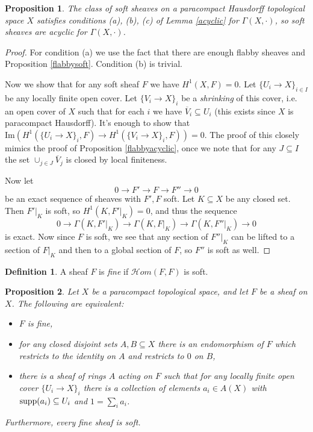 \documentclass[letterpaper,11pt]{article}
\newtheorem{prop}{Proposition}
\theoremstyle{definition}
\newtheorem{defn}{Definition}
\theoremstyle{remark}
\begin{document}
\begin{prop} The class of soft sheaves on a paracompact Hausdorff topological space $X$ satisfies conditions {\rm (a), (b), (c)} of Lemma \ref{acyclic} for $\Gamma(X,\cdot)$, so soft sheaves are acyclic for $\Gamma(X,\cdot)$.
\end{prop}
\begin{proof} For condition (a) we use the fact that there are enough flabby sheaves and Proposition \ref{flabbysoft}. Condition (b) is trivial.

Now we show that for any soft sheaf $F$ we have $H^1(X,F) = 0$. Let $\{U_i\rightarrow X\}_{i\in I}$ be any locally finite open cover. Let $\{V_i\rightarrow X\}_i$ be a \emph{shrinking} of this cover, i.e. an open cover of $X$ such that for each $i$ we have $\overline{V}_i \subseteq U_i$ (this exists since $X$ is paracompact Hausdorff). It's enough to show that $\mbox{Im}(H^1(\{U_i\rightarrow X\}_i,F)\rightarrow H^1(\{V_i\rightarrow X\}_i,F)) = 0$. The proof of this closely mimics the proof of Proposition \ref{flabbyacyclic}, once we note that for any $J\subseteq I$ the set $\cup_{j\in J}\overline{V}_j$ is closed by local finiteness.

Now let
\[
0 \rightarrow F' \rightarrow F \rightarrow F'' \rightarrow 0
\]
be an exact sequence of sheaves with $F', F$ soft. Let $K\subseteq X$ be any closed set. Then $F'|_K$ is soft, so $H^1(K,F'|_K) = 0$, and thus the sequence
\[
0 \rightarrow \Gamma(K,F'|_K) \rightarrow \Gamma(K,F|_K) \rightarrow \Gamma(K,F''|_K) \rightarrow 0
\]
is exact. Now since $F$ is soft, we see that any section of $F''|_K$ can be lifted to a section of $F|_K$ and then to a global section of $F$, so $F''$ is soft as well.
\end{proof}

\begin{defn} A sheaf $F$ is \emph{fine} if $\mathcal{H}om(F,F)$ is soft.
\end{defn}

\begin{prop}\label{fine} Let $X$ be a paracompact topological space, and let $F$ be a sheaf on $X$. The following are equivalent:
\begin{itemize}
\item[{\rm (a)}] $F$ is fine,

\item[{\rm (b)}] for any closed disjoint sets $A,B\subseteq X$ there is an endomorphism of $F$ which restricts to the identity on $A$ and restricts to $0$ on $B$,

\item[{\rm (c)}] there is a sheaf of rings $A$ acting on $F$ such that for any locally finite open cover $\{U_i \rightarrow X\}_i$ there is a collection of elements $a_i \in A(X)$ with $\mbox{\rm supp}(a_i) \subseteq U_i$ and $1 = \sum_i a_i$.
\end{itemize}
Furthermore, every fine sheaf is soft.
\end{prop}
\end{document}
